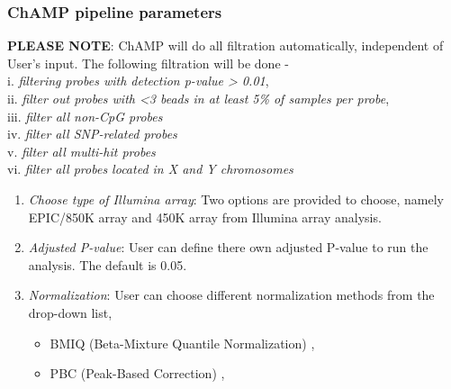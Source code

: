 \documentclass[
  a4paper,
  oneside,
  open=any]{scrreport}
\providecommand{\tightlist}{%
  \setlength{\itemsep}{0pt}\setlength{\parskip}{0pt}}\usepackage{longtable,booktabs,array}
\begin{document}
\hypertarget{champ-pipeline-parameters}{%
\subsubsection{\texorpdfstring{\textbf{ChAMP pipeline
parameters}}{ChAMP pipeline parameters}}\label{champ-pipeline-parameters}}

\begin{tcolorbox}[enhanced jigsaw, left=2mm, colback=white, breakable, leftrule=.75mm, coltitle=black, toprule=.15mm, rightrule=.15mm, colbacktitle=quarto-callout-note-color!10!white, title=\textcolor{quarto-callout-note-color}{\faInfo}\hspace{0.5em}{Note}, opacitybacktitle=0.6, colframe=quarto-callout-note-color-frame, bottomrule=.15mm, bottomtitle=1mm, toptitle=1mm, titlerule=0mm, opacityback=0, arc=.35mm]
\textbf{PLEASE NOTE}: ChAMP will do all filtration automatically,
independent of User's input. The following filtration will be done -\\
i. \emph{filtering probes with detection p-value \textgreater{} 0.01},\\
ii. \emph{filter out probes with \textless3 beads in at least 5\% of
samples per probe},\\
iii. \emph{filter all non-CpG probes}\\
iv. \emph{filter all SNP-related probes}\\
v. \emph{filter all multi-hit probes}\\
vi. \emph{filter all probes located in X and Y chromosomes}
\end{tcolorbox}

\begin{enumerate}
\def\labelenumi{\arabic{enumi}.}
\item
  \emph{Choose type of Illumina array}: Two options are provided to
  choose, namely EPIC/850K array and 450K array from Illumina array
  analysis.
\item
  \emph{Adjusted P-value}: User can define there own adjusted P-value to
  run the analysis. The default is 0.05.
\item
  \emph{Normalization}: User can choose different normalization methods
  from the drop-down list,

  \begin{itemize}
  \tightlist
  \item
    BMIQ (Beta-Mixture Quantile Normalization)
    \autocite{teschendorff2013beta},
  \item
    PBC (Peak-Based Correction) \autocite{dedeurwaerder2011evaluation},
  \end{itemize}
\end{enumerate}
\end{document}
